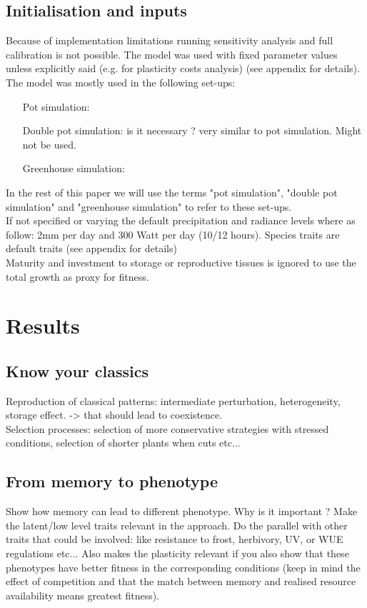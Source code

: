 \documentclass[review]{elsarticle}
\begin{document}
\subsection{Initialisation and inputs}
Because of implementation limitations running sensitivity analysis and full calibration is not possible. The model was used with fixed parameter values unless explicitly said (e.g. for plasticity costs analysis) (see appendix for details). The model was mostly used in the following set-ups:
\begin{itemize}
\item[Pot simulation:]
\item[Double pot simulation:] is it necessary ? very similar to pot simulation. Might not be used.
\item[Greenhouse simulation:]
\end{itemize}
In the rest of this paper we will use the terms "pot simulation", "double pot simulation" and "greenhouse simulation" to refer  to these set-ups.\\
If not specified or varying the default precipitation and radiance levels where as follow: 2mm per day and 300 Watt per day (10/12 hours). Species traits are default traits (see appendix for details)\\
Maturity and investment to storage or reproductive tissues is ignored to use the total growth as proxy for fitness.


\section{Results}
\subsection{Know your classics}
Reproduction of classical patterns: intermediate perturbation, heterogeneity, storage effect.
-> that should lead to coexistence.\\
Selection processes: selection of more conservative strategies with stressed conditions, selection of  shorter plants when cuts etc...
\subsection{From memory to phenotype}
Show how memory can lead to different phenotype. Why is it important ? Make the latent/low level traits relevant in the approach. Do the parallel with other traits that could be involved: like resistance to frost, herbivory, UV, or WUE regulations etc... Also makes the plasticity relevant if you also show that these phenotypes have better fitness in the corresponding conditions (keep in mind the effect of competition and that the match between memory and realised resource availability means greatest fitness).
\end{document}
